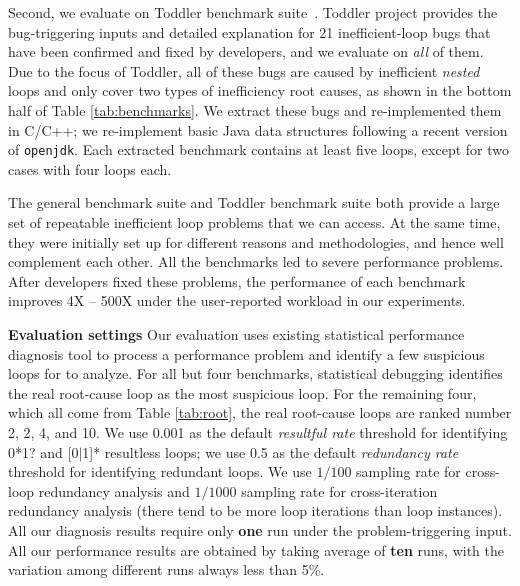 Second, we evaluate \Tool on Toddler benchmark suite~\cite{Alabama, toddlerbuglist}.
Toddler project provides the bug-triggering inputs and detailed explanation
for 21 inefficient-loop bugs that have been confirmed and fixed by developers, and
we evaluate \Tool on \emph{all} of them.
Due to the focus of Toddler, all of these bugs are caused by inefficient
\textit{nested} loops and only cover two types of inefficiency root causes,
as shown in the bottom half of Table \ref{tab:benchmarks}.
We extract these bugs and re-implemented them in 
C/C++;
we re-implement basic Java data structures following a recent version of 
\texttt{openjdk}. Each extracted benchmark contains at least five
loops, except for two cases with four loops each.

The general benchmark suite and Toddler benchmark suite both provide
a large set of repeatable inefficient loop problems that we can access. 
At the same time, they were initially set up for different reasons and
methodologies,
and hence well complement each other.
All the benchmarks led to severe performance problems.
After developers fixed these problems, the performance of each benchmark improves
4X -- 500X under the user-reported workload in our experiments. 


\noindent\textbf{Evaluation settings}
Our evaluation uses existing statistical performance diagnosis
tool \cite{SongOOPSLA2014} to process a performance problem and identify 
a few suspicious loops for \Tool to analyze.
For all but four benchmarks, statistical debugging identifies the
real root-cause loop as the most suspicious loop. For the remaining four,
which all come from Table \ref{tab:root},
the real root-cause loops are ranked number 2, 2, 4, and 10.
%
We use 0.001 as the default \textit{resultful rate} threshold for identifying
0*1? 
and [0$|$1]* resultless loops; we use 
0.5 as the default \textit{redundancy rate} threshold for identifying redundant loops.
We use $1/100$ sampling rate for cross-loop redundancy analysis and 
$1/1000$ sampling rate for cross-iteration redundancy analysis
(there tend to be more loop iterations than loop instances).
All our diagnosis results require only \textbf{one} run under the 
problem-triggering input.
All our performance results are obtained by taking average of \textbf{ten} runs, 
with the variation among different runs always less than 5\%.

